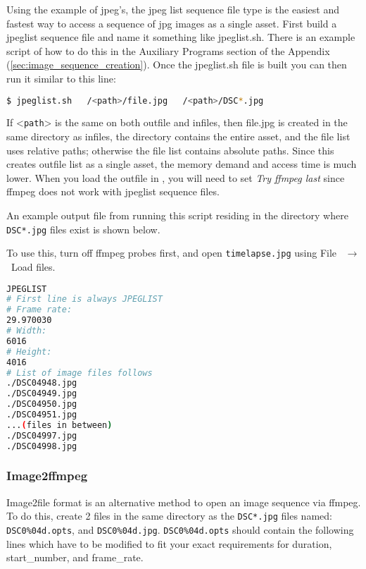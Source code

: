 Using the example of jpeg’s, the jpeg list sequence file type is the easiest and fastest way to access a sequence of jpg images as a single asset.  First build a jpeglist sequence file and name it something like jpeglist.sh.  There is an example script of how to do this in the Auxiliary Programs section of the Appendix (\ref{sec:image_sequence_creation}).  Once the jpeglist.sh file is built you can then run it similar to this line:

\begin{lstlisting}[language=bash,numbers=none]
$ jpeglist.sh   /<path>/file.jpg   /<path>/DSC*.jpg
\end{lstlisting}

\vspace*{1ex} \noindent If <\texttt{path}> is the same on both outfile and infiles, then file.jpg is created in the same directory as infiles, the directory contains the entire asset, and the file list uses relative paths; otherwise the file list contains absolute paths.   Since this creates outfile list as a single asset, the memory demand and access time is much lower.  When you load the outfile in \CGG{}, you will need to set \textit{Try ffmpeg last} since ffmpeg does not work with jpeglist sequence files.

An example output file from running this script residing in the directory where \texttt{DSC*.jpg} files exist is shown below.

To use this, turn off ffmpeg probes first, and open \texttt{timelapse.jpg} using File ~$\rightarrow$ ~Load files.

\begin{lstlisting}[language=bash,numbers=none,caption={Example: timelapse.jpg},captionpos=t]
JPEGLIST
# First line is always JPEGLIST
# Frame rate:
29.970030
# Width:
6016
# Height:
4016
# List of image files follows
./DSC04948.jpg
./DSC04949.jpg
./DSC04950.jpg
./DSC04951.jpg
...(files in between)
./DSC04997.jpg
./DSC04998.jpg
\end{lstlisting}

\subsubsection{Image2ffmpeg}%
\label{ssub:image2ffmpeg}

Image2file format is an alternative method to open an image sequence via ffmpeg.  To do this, create 2 files in the same directory as the \texttt{DSC*.jpg} files named:  \texttt{DSC0\%04d.opts}, and \texttt{DSC0\%04d.jpg}. 
\texttt{DSC0\%04d.opts} should contain the following lines which have to be modified to fit your exact requirements for duration, start\_number, and frame\_rate.


